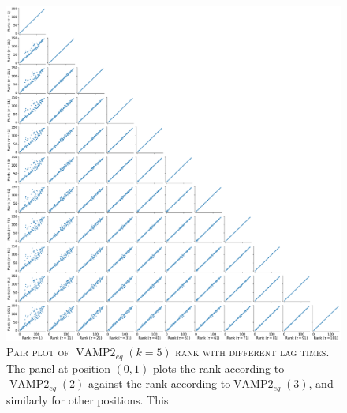 \documentclass{article}
\begin{document}
\begin{figure}
    \centering
    \includegraphics[width=1.0\textwidth]{SI_figures/1fme_vampeq_rank_vs_lag_pairplot_k10.pdf}
    \caption{\textsc{Pair plot of $\operatorname{VAMP2}_{eq}(k=5)$ rank with different lag times.} The panel at position $(0,1)$ plots the rank according to$\operatorname{VAMP2}_{eq}(2)$ against the  rank according to$\operatorname{VAMP2}_{eq}(3)$, and similarly for other positions. This }
    \label{fig:vampeq10_rank_vs_lag_pairplot}
\end{figure}



\end{document}

